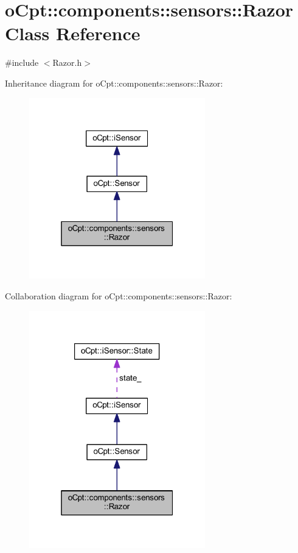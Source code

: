 \hypertarget{classo_cpt_1_1components_1_1sensors_1_1_razor}{}\section{o\+Cpt\+:\+:components\+:\+:sensors\+:\+:Razor Class Reference}
\label{classo_cpt_1_1components_1_1sensors_1_1_razor}


{\ttfamily \#include $<$Razor.\+h$>$}



Inheritance diagram for o\+Cpt\+:\+:components\+:\+:sensors\+:\+:Razor\+:\nopagebreak
\begin{figure}[H]
\begin{center}
\leavevmode
\includegraphics[width=217pt]{classo_cpt_1_1components_1_1sensors_1_1_razor__inherit__graph}
\end{center}
\end{figure}


Collaboration diagram for o\+Cpt\+:\+:components\+:\+:sensors\+:\+:Razor\+:\nopagebreak
\begin{figure}[H]
\begin{center}
\leavevmode
\includegraphics[width=217pt]{classo_cpt_1_1components_1_1sensors_1_1_razor__coll__graph}
\end{center}
\end{figure}
